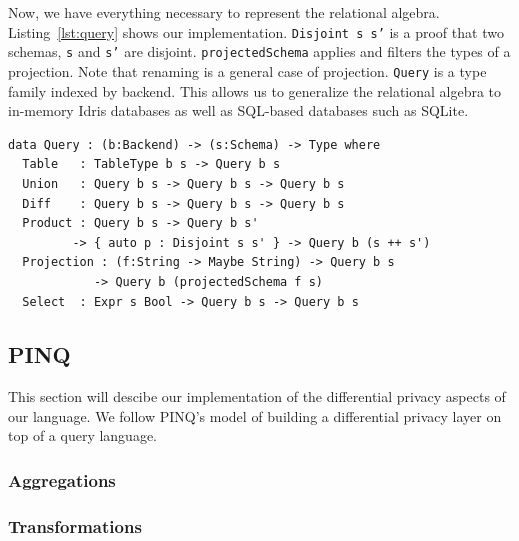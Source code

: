 \documentclass[12pt]{article}
\begin{document}
Now, we have everything necessary to represent the relational algebra.
Listing~\ref{lst:query} shows our implementation.
\texttt{Disjoint s s'} is a proof that two schemas, \texttt{s} and \texttt{s'} are disjoint.
\texttt{projectedSchema} applies and filters the types of a projection.
Note that renaming is a general case of projection.
\texttt{Query} is a type family indexed by backend.
This allows us to generalize the relational algebra to in-memory Idris databases as well as SQL-based databases such as SQLite.

\begin{lstlisting}[label={lst:query},caption=Representing typed queries]
data Query : (b:Backend) -> (s:Schema) -> Type where
  Table   : TableType b s -> Query b s
  Union   : Query b s -> Query b s -> Query b s
  Diff    : Query b s -> Query b s -> Query b s
  Product : Query b s -> Query b s'
         -> { auto p : Disjoint s s' } -> Query b (s ++ s')
  Projection : (f:String -> Maybe String) -> Query b s
            -> Query b (projectedSchema f s)
  Select  : Expr s Bool -> Query b s -> Query b s
\end{lstlisting}


\subsection{PINQ}\label{sec:pinq}

This section will descibe our implementation of the differential privacy aspects of our language. We follow PINQ's model of building a differential privacy layer on top of a query language.

\subsubsection{Aggregations}\label{sec:pinq:aggregations}

\subsubsection{Transformations}\label{sec:pinq:transformations}
\end{document}
